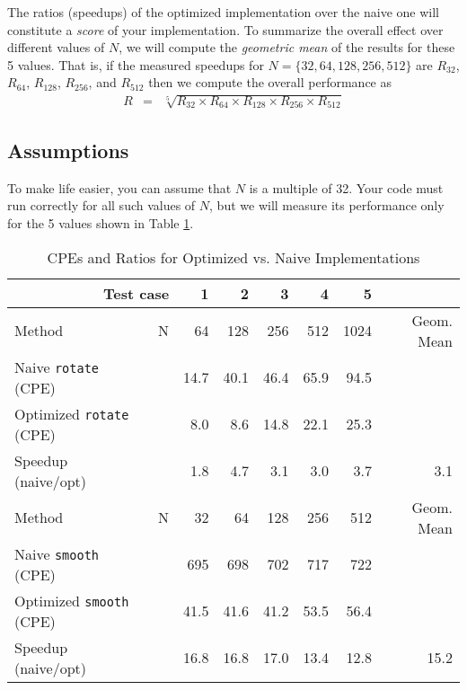 \documentclass[11pt]{article}
\begin{document}
The ratios (speedups) of the optimized implementation over the naive
one will constitute a {\it score} of your implementation.
To summarize the overall effect over different values of $N$,
we will compute the {\em geometric mean} of the
results for  these 5 values. That is,
if the measured speedups for $N=\{32, 64, 128, 256, 512\}$ are
$R_{32}$, $R_{64}$, $R_{128}$, $ R_{256}$,  and $ R_{512}$
then we compute the overall performance as
\begin{eqnarray*}
R & = & \sqrt[5]{R_{32} \times R_{64} \times R_{128} \times R_{256}  \times R_{512}}
\end{eqnarray*}

\subsection*{Assumptions}
To make life easier, you can assume that $N$ is a multiple
of 32.  Your code must run correctly for all such values of $N$, but
we will measure its performance only for the 5 values shown in Table
\ref{tbl:cpes}.


\begin{table}
\begin{center}
\begin{tabular}{|ll|rrrrr|r|}
\hline
\multicolumn{2}{|r|}{Test case}&1&2&3&4&5&\\
\hline
\hline
Method & N & 64 & 128 & 256 & 512 & 1024 & Geom. Mean \\
\hline
Naive {\tt rotate} (CPE)
&   & 14.7 &  40.1 &  46.4 &  65.9 &  94.5 & \\
\hline
Optimized {\tt rotate} (CPE)
&   & 8.0  & 8.6 &  14.8 &  22.1 &  25.3 & \\
\hline
Speedup (naive/opt)
&   &  1.8 &   4.7  & 3.1  &  3.0  &  3.7  &  3.1   \\
\hline
\hline
Method & N & 32 & 64 & 128 & 256 & 512 & Geom. Mean \\
\hline
Naive {\tt smooth} (CPE)
& & 695 & 698 & 702 & 717 & 722 & \\
\hline
Optimized {\tt smooth} (CPE)
& & 41.5 & 41.6 & 41.2 & 53.5 & 56.4 & \\
\hline
Speedup (naive/opt)
& & 16.8 &  16.8 & 17.0 & 13.4 & 12.8 & 15.2 \\
\hline
\end{tabular}
\end{center}
\caption{CPEs and Ratios for Optimized vs. Naive Implementations}
\label{tbl:cpes}
\end{table}
\end{document}

